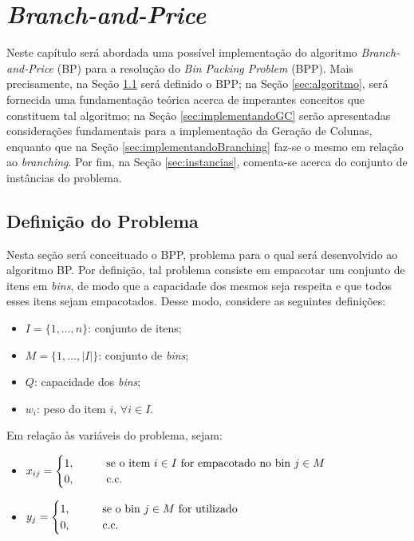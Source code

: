 \chapter{\textit{Branch-and-Price}}

Neste capítulo será abordada uma possível implementação do algoritmo \textit{Branch-and-Price} (BP) para a resolução do \textit{Bin Packing Problem} (BPP). Mais precisamente, na Seção \ref{sec:definicao} será definido o BPP; na Seção \ref{sec:algoritmo}, será fornecida uma fundamentação teórica acerca de imperantes conceitos que constituem tal algoritmo; na Seção \ref{sec:implementandoGC} serão apresentadas considerações fundamentais para a implementação da Geração de Colunas, enquanto que na Seção \ref{sec:implementandoBranching} faz-se o mesmo em relação ao \textit{branching}. Por fim, na Seção \ref{sec:instancias}, comenta-se acerca do conjunto de instâncias do problema. 

\section{Definição do Problema} \label{sec:definicao}

Nesta seção será conceituado o BPP, problema para o qual será desenvolvido ao algoritmo BP. Por definição, tal problema consiste em empacotar um conjunto de itens em \textit{bins}, de modo que a capacidade dos mesmos seja respeita e que todos esses itens sejam empacotados. Desse modo, considere as seguintes definições:

\begin{itemize}
    \item $I = \{1, ..., n\}$: conjunto de itens;
    \item $M = \{1, ..., |I|\}$: conjunto de \textit{bins};
    \item $Q$: capacidade dos \textit{bins};
    \item $w_i$: peso do item $i$, $\forall i \in I$.
\end{itemize}

Em relação às variáveis do problema, sejam:

\begin{itemize}
    \item $x_{ij} = \begin{cases}
        1, \hspace{10 mm} \text{se o item $i \in I$ for empacotado no bin $j \in M$} \\ 
        0, \hspace{10 mm} \text{c.c.}
    \end{cases}$
    \item $y_{j} = \begin{cases}
        1, \hspace{10 mm} \text{se o bin $j \in M$ for utilizado} \\ 
        0, \hspace{10 mm} \text{c.c.}
    \end{cases}$
\end{itemize}


